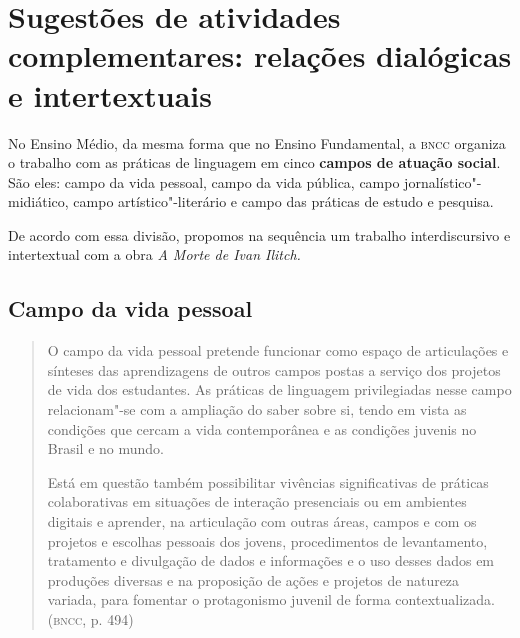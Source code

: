 \documentclass[12pt]{extarticle}
\begin{document}




\section{Sugestões de atividades complementares: relações dialógicas e
intertextuais}


No Ensino Médio, da mesma forma que no Ensino Fundamental, a \textsc{bncc}
organiza o trabalho com as práticas de linguagem em cinco \textbf{campos
de atuação social}. São eles: campo da vida pessoal, campo da vida
pública, campo jornalístico"-midiático, campo artístico"-literário e campo
das práticas de estudo e pesquisa.

De acordo com essa divisão, propomos na sequência um trabalho
interdiscursivo e intertextual com a obra \emph{A Morte de Ivan Ilitch.}

\subsection{Campo da vida pessoal}

\begin{quote}
O campo da vida pessoal pretende funcionar como espaço de articulações
e sínteses das aprendizagens de outros campos postas a serviço dos
projetos de vida dos estudantes. As práticas de linguagem privilegiadas
nesse campo relacionam"-se com a ampliação do saber sobre si, tendo em
vista as condições que cercam a vida contemporânea e as condições
juvenis no Brasil e no mundo.

Está em questão também possibilitar vivências significativas de práticas
colaborativas em situações de interação presenciais ou em ambientes
digitais e aprender, na articulação com outras áreas, campos e com os
projetos e escolhas pessoais dos jovens, procedimentos de levantamento,
tratamento e divulgação de dados e informações e o uso desses dados em
produções diversas e na proposição de ações e projetos de natureza
variada, para fomentar o protagonismo juvenil de forma
contextualizada. (\textsc{bncc}, p. 494)
\end{quote}
\end{document}
